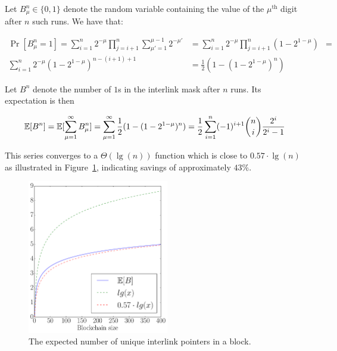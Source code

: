 Let $B^n_\mu \in \{0, 1\}$ denote the random variable containing the value of
the $\mu^{\text{th}}$ digit after $n$ such runs. We have that:

\begin{align*}
\Pr[B^n_\mu = 1] =
\sum_{i = 1}^n 2^{-\mu} \prod_{j = i + 1}^n \sum_{\mu' = 1}^{\mu - 1} 2^{-\mu'} &= \sum_{i = 1}^n 2^{-\mu} \prod_{j = i + 1}^n (1 - 2^{1 - \mu}) &=\\
\sum_{i = 1}^n 2^{-\mu} (1 - 2^{1 -\mu})^{n - (i + 1) + 1} &= \frac{1}{2} (1 - (1 - 2^{1 - \mu})^n)
\end{align*}

Let $B^n$ denote the number of $1$s in the interlink mask after $n$ runs. Its
expectation is then

\[
  \operatorname{\mathbb{E}}[B^n] = \operatorname{\mathbb{E}}[\sum_{\mu = 1}^\infty B^n_\mu] =
  \sum_{\mu = 1}^\infty \frac{1}{2} (1 - (1 - 2^{1 - \mu})^n) =
  \frac{1}{2} \sum_{i = 1}^n (-1)^{i+1} {n \choose i} \frac{2^i}{2^i - 1}
\]

This series converges to a $\Theta(\lg(n))$ function which is close to
$0.57 \cdot \lg(n)$ as illustrated in Figure~\ref{fig.log2}, indicating
savings of approximately $43\%$.

\begin{figure}[h]
\begin{center}
  \includegraphics[width=0.55\textwidth]{figures/exp_blockset_size.pdf}
  \caption{The expected number of unique interlink pointers in a block.}
  \label{fig.log2}
  \end{center}
\end{figure}

